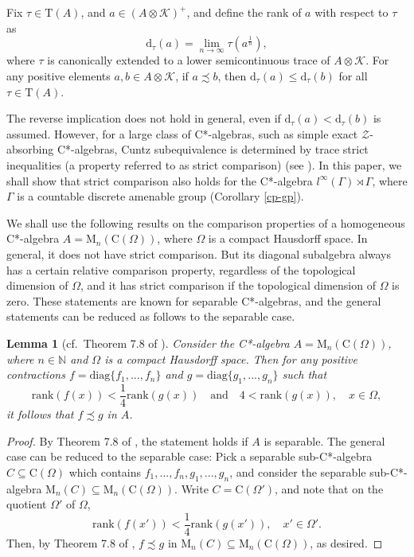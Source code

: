 \documentclass[12pt, oneside, psamsfonts]{amsart}
\newtheorem{lem}[thm]{Lemma}
\theoremstyle{definition}
\theoremstyle{remark}
\numberwithin{equation}{section}
\newcommand{\tr}{\mathrm{T}}
\begin{document}
Fix $\tau \in \tr(A)$, and $a \in (A \otimes \mathcal K)^+$, and define the rank of $a$ with respect to $\tau$ as 
$$\mathrm{d}_\tau(a) = \lim_{n \to\infty} \tau(a^{\frac{1}{n}}),$$
where $\tau$ is canonically extended to a lower semicontinuous trace of $A \otimes\mathcal K$. 
For any positive elements $a, b \in A \otimes \mathcal K$, if $a \precsim b$, then $\mathrm{d}_\tau(a) \leq \mathrm{d}_\tau(b)$ for all $\tau \in \tr(A)$. %

The reverse implication does not hold in general, even if $\mathrm{d}_\tau(a) < \mathrm{d}_\tau(b)$ is assumed. However, for a large class of C*-algebras, such as simple exact $\mathcal Z$-absorbing C*-algebras, Cuntz subequivalence is determined by trace strict inequalities (a property referred to as strict comparison) (see \cite{Ror-Z-stable}). In this paper, we shall show that strict comparison also holds for the C*-algebra $l^\infty(\Gamma) \rtimes \Gamma$, where $\Gamma$ is a countable discrete amenable group (Corollary \ref{cp-gp}).


We shall use the following results on the comparison properties of a homogeneous C*-algebra $A=\mathrm{M}_n(\mathrm{C}(\Omega))$, where $\Omega$ is a compact Hausdorff space. In general, it  does not have strict comparison. But its diagonal subalgebra always has a certain relative comparison property, regardless of the topological dimension of $\Omega$, and it has strict comparison if the topological dimension of $\Omega$ is zero.  These statements are known for separable C*-algebras, and the general statements can be reduced as follows to the separable case. 
\begin{lem}[cf.~Theorem 7.8 of \cite{Niu-MD-Z}]\label{matrix-C}
Consider the C*-algebra $A=\mathrm{M}_n(\mathrm{C}(\Omega))$, where $n \in \mathbb{N}$ and $\Omega$ is a compact Hausdorff space. Then for any positive contractions $f = \mathrm{diag}\{f_1, ..., f_n\}$ and $g = \mathrm{diag}\{g_1, ..., g_n\}$ such that
$$\mathrm{rank}(f(x)) < \frac{1}{4} \mathrm{rank}(g(x)) \quad\mathrm{and} \quad 4 < \mathrm{rank}(g(x)), \quad x \in \Omega, $$ it follows that $f \precsim g$ in $A$. 
\end{lem}
\begin{proof}
By Theorem 7.8 of \cite{Niu-MD-Z}, the statement holds if $A$ is separable.  The general case can be reduced to the separable case: 
Pick a separable sub-C*-algebra $C \subseteq \mathrm{C}(\Omega)$ which contains $f_1,..., f_n, g_1, ..., g_n$, and consider the separable sub-C*-algebra $\mathrm{M}_n(C) \subseteq \mathrm{M}_n(\mathrm{C}(\Omega))$. Write $C = \mathrm{C}(\Omega')$, and note that on the quotient $\Omega'$ of $\Omega$, 
$$\mathrm{rank}(f(x')) < \frac{1}{4} \mathrm{rank}(g(x')), \quad x' \in \Omega'.$$ Then, by Theorem 7.8 of \cite{Niu-MD-Z}, $f \precsim g$ in $\mathrm{M}_n(C) \subseteq \mathrm{M}_n(\mathrm{C}(\Omega))$, as desired.
\end{proof}
\end{document}
